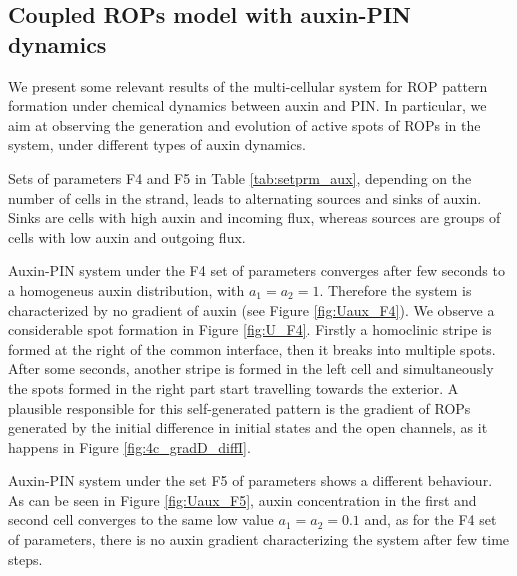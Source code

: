 \subsection{Coupled ROPs model with auxin-PIN dynamics}
We present some relevant results of the multi-cellular system for ROP pattern formation under chemical dynamics between auxin and PIN. In particular, we aim at observing the generation and evolution of active spots of ROPs in the system, under different types of auxin dynamics.

Sets of parameters F4 and F5 in Table \ref{tab:setprm_aux}, depending on the number of cells in the strand, leads to alternating sources and sinks of auxin. Sinks are cells with high auxin and incoming flux, whereas sources are groups of cells with low auxin and outgoing flux.

Auxin-PIN system under the F4 set of parameters converges after few seconds to a homogeneus auxin distribution, with $a_1 = a_2 = 1$. Therefore the system is characterized by no gradient of auxin (see Figure \ref{fig:Uaux_F4}). We observe a considerable spot formation in Figure \ref{fig:U_F4}. Firstly a homoclinic stripe is formed at the right of the common interface, then it breaks into multiple spots. After some seconds, another stripe is formed in the left cell and simultaneously the spots formed in the right part start travelling towards the exterior. A plausible responsible for this self-generated pattern is the gradient of ROPs generated by the initial difference in initial states and the open channels, as it happens in Figure \ref{fig:4c_gradD_diffI}.


Auxin-PIN system under the set F5 of parameters shows a different behaviour. As can be seen in Figure \ref{fig:Uaux_F5}, auxin concentration in the first and second cell converges to the same low value $a_1 = a_2 = 0.1$ and, as for the F4 set of parameters, there is no auxin gradient characterizing the system after few time steps.

